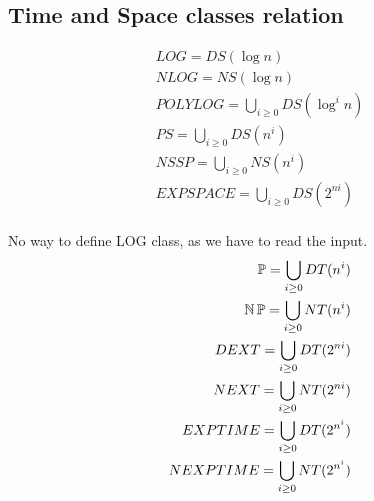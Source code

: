 \subsection{Time and Space classes relation}

\begin{reminder}
	\begin{equation}
	\begin{split}
		LOG = DS(\log n) \\
		NLOG = NS(\log n) \\
		POLYLOG = \bigcup_{i \geq 0} DS(\log^i n )\\
		PS = \bigcup_{i \geq 0} DS(n^i)\\
		NSSP = \bigcup_{i \geq 0} NS(n^i)\\
		EXPSPACE = \bigcup_{i \geq 0} DS(2^{ni})\\
	\end{split}
	\end{equation}
\end{reminder}

\begin{reminder}
	No way to define LOG class, as we have to read the input.
	\begin{equation}
	\begin{split}
		\operatorname{\mathbb{P}} = \bigcup_{i \geq 0} DT(n^i)\\
		\operatorname{\operatorname{\mathbb{N}}\mathbb{P}} = \bigcup_{i \geq 0} NT(n^i)\\
		DEXT = \bigcup_{i \geq 0} DT(2^{ni})\\
		NEXT = \bigcup_{i \geq 0} NT(2^{ni})\\
		EXPTIME = \bigcup_{i \geq 0} DT(2^{n^i})\\
		NEXPTIME = \bigcup_{i \geq 0} NT(2^{n^i})\\
	\end{split}
	\end{equation}
\end{reminder}

